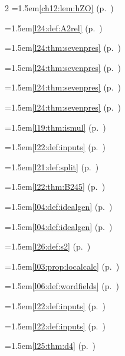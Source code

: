 \begin{multicols}{2}
\hangindent=1.5em\quad \ref{ch12:lem:hZO} (p.~\pageref{ch12:lem:hZO})\par
\par{}\par\nopagebreak\smallskip
\hangindent=1.5em\quad \ref{l24:def:A2rel} (p.~\pageref{l24:def:A2rel})\par
\hangindent=1.5em\quad \ref{l24:thm:sevenpres} (p.~\pageref{l24:thm:sevenpres})\par
\hangindent=1.5em\quad \ref{l24:thm:sevenpres} (p.~\pageref{l24:thm:sevenpres})\par
\hangindent=1.5em\quad \ref{l24:thm:sevenpres} (p.~\pageref{l24:thm:sevenpres})\par
\hangindent=1.5em\quad \ref{l24:thm:sevenpres} (p.~\pageref{l24:thm:sevenpres})\par
\hangindent=1.5em\quad \ref{l19:thm:ismul} (p.~\pageref{l19:thm:ismul})\par
\hangindent=1.5em\quad \ref{l22:def:inputs} (p.~\pageref{l22:def:inputs})\par
\hangindent=1.5em\quad \ref{l21:def:split} (p.~\pageref{l21:def:split})\par
\hangindent=1.5em\quad \ref{l22:thm:B245} (p.~\pageref{l22:thm:B245})\par
\hangindent=1.5em\quad \ref{l04:def:idealgen} (p.~\pageref{l04:def:idealgen})\par
\hangindent=1.5em\quad \ref{l04:def:idealgen} (p.~\pageref{l04:def:idealgen})\par
\hangindent=1.5em\quad \ref{l26:def:s2} (p.~\pageref{l26:def:s2})\par
\hangindent=1.5em\quad \ref{l03:prop:localcalc} (p.~\pageref{l03:prop:localcalc})\par
\hangindent=1.5em\quad \ref{l06:def:wordfields} (p.~\pageref{l06:def:wordfields})\par
\hangindent=1.5em\quad \ref{l22:def:inputs} (p.~\pageref{l22:def:inputs})\par
\hangindent=1.5em\quad \ref{l22:def:inputs} (p.~\pageref{l22:def:inputs})\par
\hangindent=1.5em\quad \ref{l25:thm:d4} (p.~\pageref{l25:thm:d4})\par

\end{multicols}
